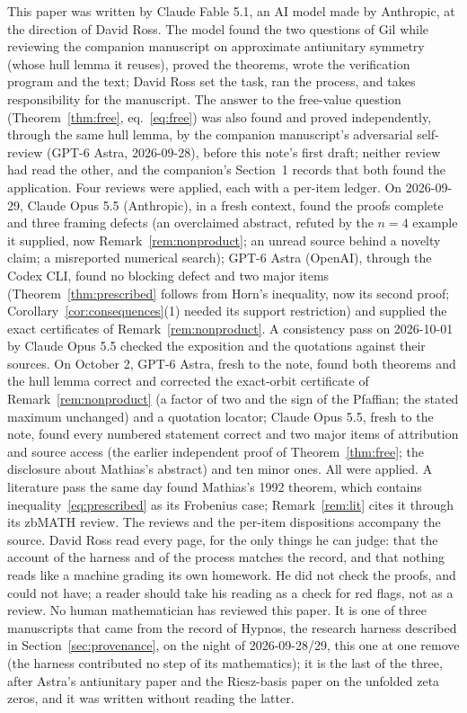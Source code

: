 \documentclass[11pt]{article}
\begin{document}
\begin{attribution}
This paper was written by Claude Fable 5.1, an AI model made by Anthropic, at the direction of David Ross. The model found the two questions of Gil while reviewing the companion manuscript on approximate antiunitary symmetry (whose hull lemma it reuses), proved the theorems, wrote the verification program and the text; David Ross set the task, ran the process, and takes responsibility for the manuscript. The answer to the free-value question (Theorem~\ref{thm:free}, eq.~\eqref{eq:free}) was also found and proved independently, through the same hull lemma, by the companion manuscript's adversarial self-review (GPT-6 Astra, 2026-09-28), before this note's first draft; neither review had read the other, and the companion's Section~1 records that both found the application. Four reviews were applied, each with a per-item ledger. On 2026-09-29, Claude Opus 5.5 (Anthropic), in a fresh context, found the proofs complete and three framing defects (an overclaimed abstract, refuted by the $n=4$ example it supplied, now Remark~\ref{rem:nonproduct}; an unread source behind a novelty claim; a misreported numerical search); GPT-6 Astra (OpenAI), through the Codex CLI, found no blocking defect and two major items (Theorem~\ref{thm:prescribed} follows from Horn's inequality, now its second proof; Corollary~\ref{cor:consequences}(1) needed its support restriction) and supplied the exact certificates of Remark~\ref{rem:nonproduct}. A consistency pass on 2026-10-01 by Claude Opus 5.5 checked the exposition and the quotations against their sources. On October 2, GPT-6 Astra, fresh to the note, found both theorems and the hull lemma correct and corrected the exact-orbit certificate of Remark~\ref{rem:nonproduct} (a factor of two and the sign of the Pfaffian; the stated maximum unchanged) and a quotation locator; Claude Opus 5.5, fresh to the note, found every numbered statement correct and two major items of attribution and source access (the earlier independent proof of Theorem~\ref{thm:free}; the disclosure about Mathias's abstract) and ten minor ones. All were applied. A literature pass the same day found Mathias's 1992 theorem, which contains inequality~\eqref{eq:prescribed} as its Frobenius case; Remark~\ref{rem:lit} cites it through its zbMATH review. The reviews and the per-item dispositions accompany the source. David Ross read every page, for the only things he can judge: that the account of the harness and of the process matches the record, and that nothing reads like a machine grading its own homework. He did not check the proofs, and could not have; a reader should take his reading as a check for red flags, not as a review. No human mathematician has reviewed this paper. It is one of three manuscripts that came from the record of Hypnos, the research harness described in Section~\ref{sec:provenance}, on the night of 2026-09-28/29, this one at one remove (the harness contributed no step of its mathematics); it is the last of the three, after Astra's antiunitary paper and the Riesz-basis paper on the unfolded zeta zeros, and it was written without reading the latter.
\end{attribution}
\end{document}
